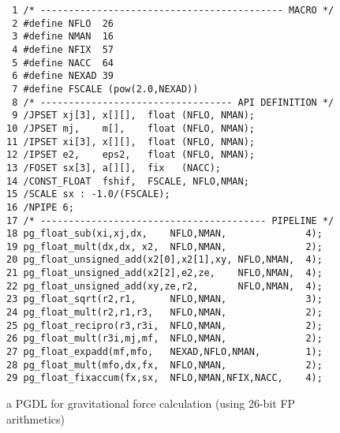 \documentclass{article}
\begin{document}
{\begin{figure}[t]
\begin{minipage}[b]{1.0\linewidth}\centering
\scriptsize
{\tiny
\begin{verbatim}
 1 /* ------------------------------------------- MACRO */
 2 #define NFLO  26
 3 #define NMAN  16
 4 #define NFIX  57
 5 #define NACC  64
 6 #define NEXAD 39
 7 #define FSCALE (pow(2.0,NEXAD))
 8 /* ---------------------------------- API DEFINITION */
 9 /JPSET xj[3], x[][],  float (NFLO, NMAN);
10 /JPSET mj,    m[],    float (NFLO, NMAN);
11 /IPSET xi[3], x[][],  float (NFLO, NMAN);
12 /IPSET e2,    eps2,   float (NFLO, NMAN);
13 /FOSET sx[3], a[][],  fix   (NACC);
14 /CONST_FLOAT  fshif,  FSCALE, NFLO,NMAN;
15 /SCALE sx : -1.0/(FSCALE);
16 /NPIPE 6;
17 /* ---------------------------------------- PIPELINE */
18 pg_float_sub(xi,xj,dx,    NFLO,NMAN,              4);
19 pg_float_mult(dx,dx, x2,  NFLO,NMAN,              2);
20 pg_float_unsigned_add(x2[0],x2[1],xy, NFLO,NMAN,  4);
21 pg_float_unsigned_add(x2[2],e2,ze,    NFLO,NMAN,  4);
22 pg_float_unsigned_add(xy,ze,r2,       NFLO,NMAN,  4);
23 pg_float_sqrt(r2,r1,      NFLO,NMAN,              3);
24 pg_float_mult(r2,r1,r3,   NFLO,NMAN,              2);
25 pg_float_recipro(r3,r3i,  NFLO,NMAN,              2);
26 pg_float_mult(r3i,mj,mf,  NFLO,NMAN,              2);
27 pg_float_expadd(mf,mfo,   NEXAD,NFLO,NMAN,        1);
28 pg_float_mult(mfo,dx,fx,  NFLO,NMAN,              2);
29 pg_float_fixaccum(fx,sx,  NFLO,NMAN,NFIX,NACC,    4);
\end{verbatim}
}
\end{minipage}
\caption{a PGDL for gravitational force calculation (using 26-bit FP arithmetics)}\label{figgravfloat_pgdl}
\end{figure}




}
\end{document}
